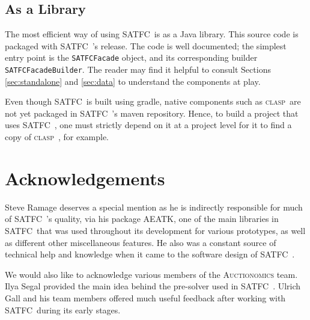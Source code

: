 \documentclass[
10pt, %
letterpaper, %
oneside, %
headinclude,footinclude, %
BCOR5mm, %
needspace, %
]{scrartcl}
\newcommand{\SATFC}{\textsc{SATFC}~}
\newcommand{\clasp}{\textsc{clasp}~}
\newcommand{\AEATK}{\textsc{AEATK}}
\begin{document}
\subsection{As a Library}

The most efficient way of using \SATFC is as a Java library. This source code is packaged with \SATFC's release. The code is well documented; the simplest entry point is the \texttt{SATFCFacade} object, and its corresponding builder \texttt{SATFCFacadeBuilder}. The reader may find it helpful to consult Sections \ref{sec:standalone} and \ref{sec:data} to understand the components at play.

Even though \SATFC is built using gradle, native components such as \clasp are not yet packaged in \SATFC's maven repository. Hence, to build a project that uses \SATFC, one must strictly depend on it at a project level for it to find a copy of \clasp, for example. 

%

\section{Acknowledgements} 

Steve Ramage deserves a special mention as he is indirectly responsible for much of \SATFC's quality, via his package \AEATK, one of the main libraries in \SATFC that was used throughout its development for various prototypes, as well as different other miscellaneous features. He also was a constant source of technical help and knowledge when it came to the software design of \SATFC.

We would also like to acknowledge various members of the \textsc{Auctionomics} team. Ilya Segal provided the main idea behind the pre-solver used in \SATFC. Ulrich Gall and his team members offered much useful feedback after working with \SATFC during its early stages.
\end{document}
